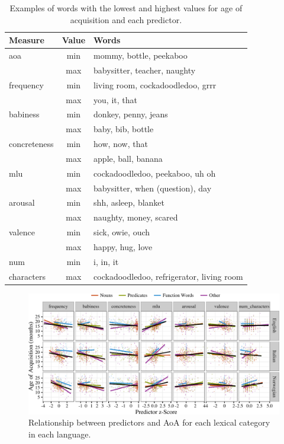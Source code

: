\documentclass[10pt, letterpaper]{article}
\newenvironment{CodeChunk}{}{}
\begin{document}
\begin{table}[!hb]
\centering
\begin{tabular}{lcl}
  \hline
Measure & Value & Words \\ 
  \hline
aoa & min & mommy, bottle, peekaboo \\ 
   & max & babysitter, teacher, naughty \\ 
  frequency & min & living room, cockadoodledoo, grrr \\ 
   & max & you, it, that \\ 
  babiness & min & donkey, penny, jeans \\ 
   & max & baby, bib, bottle \\ 
  concreteness & min & how, now, that \\ 
   & max & apple, ball, banana \\ 
  mlu & min & cockadoodledoo, peekaboo, uh oh \\ 
   & max & babysitter, when (question), day \\ 
  arousal & min & shh, asleep, blanket \\ 
   & max & naughty, money, scared \\ 
  valence & min & sick, owie, ouch \\ 
   & max & happy, hug, love \\ 
  num & min & i, in, it \\ 
  characters & max & cockadoodledoo, refrigerator, living room \\ 
   \hline
\end{tabular}
\caption{Examples of words with the lowest and highest values for age of acquisition and each predictor.} 
\label{tab:mytable}
\end{table}

\begin{CodeChunk}
\begin{figure}[!h]

{\centering \includegraphics{figs/data-1} 

}

\caption[Relationship between predictors and AoA for each lexical category in each language]{Relationship between predictors and AoA for each lexical category in each language.}\label{fig:data}
\end{figure}
\end{CodeChunk}
\end{document}
